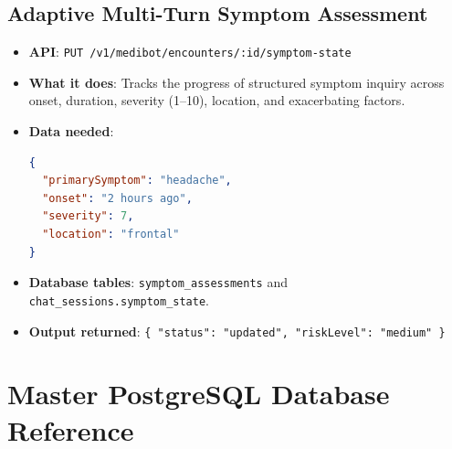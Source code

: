 \documentclass[11pt,a4paper]{article}
\begin{document}
\subsection{Adaptive Multi-Turn Symptom Assessment}
\begin{itemize}
    \item \textbf{API}: \texttt{PUT /v1/medibot/encounters/:id/symptom-state}
    \item \textbf{What it does}: Tracks the progress of structured symptom inquiry across onset, duration, severity (1--10), location, and exacerbating factors.
    \item \textbf{Data needed}:
\begin{lstlisting}[language=json]
{
  "primarySymptom": "headache",
  "onset": "2 hours ago",
  "severity": 7,
  "location": "frontal"
}
\end{lstlisting}
    \item \textbf{Database tables}: \texttt{symptom\_assessments} and \texttt{chat\_sessions.symptom\_state}.
    \item \textbf{Output returned}: \texttt{\{ "status": "updated", "riskLevel": "medium" \}}
\end{itemize}

\section{Master PostgreSQL Database Reference}
\end{document}
